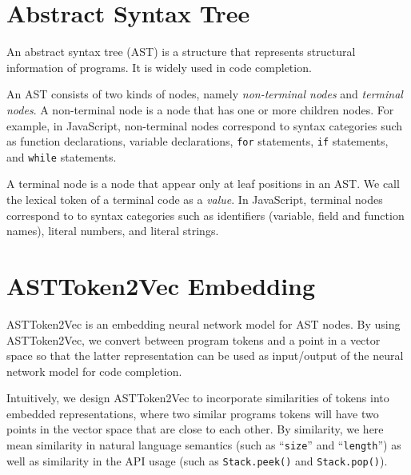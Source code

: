 \documentclass[E]{compsoft}
\begin{document}


\section{Abstract Syntax Tree}
An abstract syntax tree (AST) is a structure that represents structural information of programs. It is widely used in code completion.

An AST consists of two kinds of nodes, namely \emph{non-terminal nodes} and \emph{terminal nodes}.
A non-terminal node is a node that has one or more children nodes. 
For example, in JavaScript, non-terminal nodes correspond to syntax categories such as function declarations, variable declarations, \texttt{for} statements, \texttt{if} statements, and \texttt{while} statements.

A terminal node is a node that appear only at leaf positions in an AST.
We call the lexical token of a terminal code as a \emph{value}.
In JavaScript, terminal nodes correspond to to syntax categories such as identifiers (variable, field and function names), literal numbers, and literal strings.  




\section{ASTToken2Vec Embedding}
\label{section:node2vec}
ASTToken2Vec is an embedding neural network model for AST nodes.  By using ASTToken2Vec, we convert between program tokens and a point in a vector space so that the latter representation can be used as input/output of the neural network model for code completion.  

Intuitively, we design ASTToken2Vec to incorporate similarities of tokens into embedded representations, where two similar programs tokens will have two points in the vector space that are close to each other.  By similarity, we here mean similarity in natural language semantics (such as ``\texttt{size}'' and ``\texttt{length}'') as well as similarity in the API usage (such as \texttt{Stack.peek()} and \texttt{Stack.pop()}).
\end{document}
